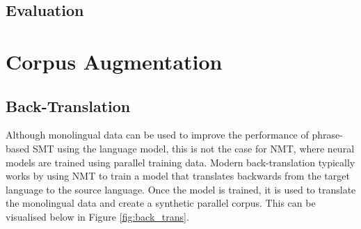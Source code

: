 








\subsection{Evaluation}


\clearpage

\section{Corpus Augmentation}

\subsection{Back-Translation}
Although monolingual data can be used to improve the performance of phrase-based \acrfull{SMT} using the language model, this is not the case for \acrshort{NMT}, where neural models are trained using parallel training data. Modern back-translation typically works by using \acrshort{NMT} to train a model that translates backwards from the target language to the source language. Once the model is trained, it is used to translate the monolingual data and create a synthetic parallel corpus. This can be visualised below in Figure \ref{fig:back_trans}.

